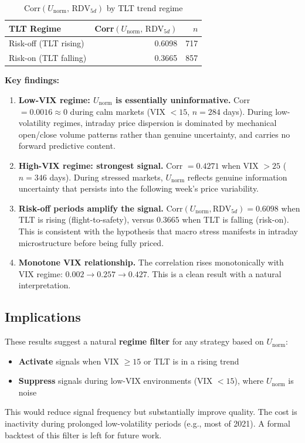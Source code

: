 \documentclass[11pt]{article}
\begin{document}
\begin{table}[htbp]
\centering
\caption{Corr$(U_\mathrm{norm},\, \mathrm{RDV}_{5d})$ by TLT trend regime}
\begin{tabular}{lrr}
\toprule
TLT Regime & Corr$(U_\mathrm{norm},\, \mathrm{RDV}_{5d})$ & $n$ \\
\midrule
Risk-off (TLT rising)  & 0.6098 & 717 \\
Risk-on (TLT falling)  & 0.3665 & 857 \\
\bottomrule
\end{tabular}
\end{table}

\textbf{Key findings:}
\begin{enumerate}
    \item \textbf{Low-VIX regime: $U_\mathrm{norm}$ is essentially uninformative.} Corr $= 0.0016 \approx 0$ during calm markets (VIX $< 15$, $n = 284$ days). During low-volatility regimes, intraday price dispersion is dominated by mechanical open/close volume patterns rather than genuine uncertainty, and carries no forward predictive content.
    \item \textbf{High-VIX regime: strongest signal.} Corr $= 0.4271$ when VIX $> 25$ ($n = 346$ days). During stressed markets, $U_\mathrm{norm}$ reflects genuine information uncertainty that persists into the following week's price variability.
    \item \textbf{Risk-off periods amplify the signal.} Corr$(U_\mathrm{norm}, \mathrm{RDV}_{5d}) = 0.6098$ when TLT is rising (flight-to-safety), versus $0.3665$ when TLT is falling (risk-on). This is consistent with the hypothesis that macro stress manifests in intraday microstructure before being fully priced.
    \item \textbf{Monotone VIX relationship.} The correlation rises monotonically with VIX regime: $0.002 \to 0.257 \to 0.427$. This is a clean result with a natural interpretation.
\end{enumerate}

\subsection{Implications}

These results suggest a natural \textbf{regime filter} for any strategy based on $U_\mathrm{norm}$:
\begin{itemize}
    \item \textbf{Activate} signals when VIX $\geq 15$ or TLT is in a rising trend
    \item \textbf{Suppress} signals during low-VIX environments (VIX $< 15$), where $U_\mathrm{norm}$ is noise
\end{itemize}
This would reduce signal frequency but substantially improve quality. The cost is inactivity during prolonged low-volatility periods (e.g., most of 2021). A formal backtest of this filter is left for future work.
\end{document}
